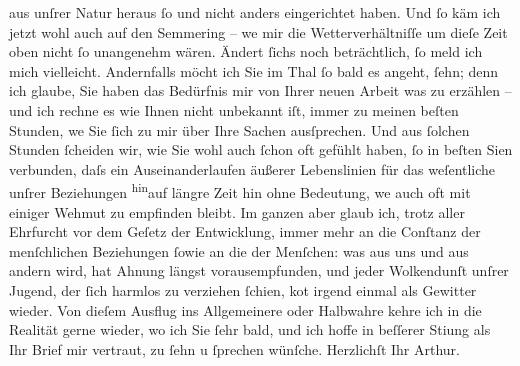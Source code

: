                aus unſrer Natur heraus{ }ſo und nicht anders eingerichtet haben. Und{ }ſo käm ich jetzt
               wohl auch auf den Semmering – we{\geminationn} mir die Wetterverhältniſſe um dieſe Zeit oben nicht{ }ſo
               unangenehm wären. Ändert{ }ſichs noch beträchtlich,{ }ſo meld ich mich vielleicht.
               Andernfalls möcht ich Sie im Thal{ }ſo bald es angeht,{ }ſehn; denn ich glaube, {\pb}Sie haben das Bedürfnis mir von Ihrer neuen Arbeit was zu erzählen – und
               ich rechne es wie Ihnen nicht unbekannt iſt, immer zu meinen beſten Stunden, we{\geminationn} Sie{ }ſich zu mir über Ihre Sachen ausſprechen. Und aus{ }ſolchen Stunden{ }ſcheiden wir, wie Sie wohl auch{ }ſchon oft gefühlt haben,{ }ſo in beſten
                  Si{\geminationn}en verbunden, daſs ein Auseinanderlaufen äußerer
               Lebenslinien für das weſentliche unſrer Beziehungen \substVorne{}\textsuperscript{hin}\substDazwischen{}auf\substHinten{} längre Zeit \introOben{}hin\introOben{} ohne Bedeutung, we{\geminationn} auch oft mit einiger Wehmut zu empfinden bleibt. Im
               ganzen aber glaub ich, trotz aller Ehrfurcht vor dem Geſetz der Entwicklung, immer
               mehr an die Conſtanz der \introOben{}menſchlichen\introOben{} Beziehungen \introOben{}ſo\introOben{}wie an die der Menſchen: was aus uns und aus andern wird,
               hat Ahnung längst vorausempfunden, und jeder Wolkendunſt unſrer Jugend, der{ }ſich
               harmlos zu verziehen{ }ſchien, ko{\geminationm}t irgend einmal als
               Gewitter wieder. Von dieſem Ausflug ins Allgemeinere oder Halbwahre kehre ich in die
               Realität gerne wieder, wo ich Sie{ }ſehr bald, und ich hoffe in beſſerer Sti{\geminationm}ung als Ihr Brief mir vertraut, zu{ }ſehn u{ }ſprechen
               wünſche.\pend
           \pstart Herzlichſt Ihr \spacefill\mbox{Arthur.}\pend{}\endnumbering{}  \newcommand{\dateiname}{L02168}\newcommand{\titel}{Arthur Schnitzler an Hugo von Hofmannsthal, 28. 3. 1914}\newcommand{\editorInnen}{Martin Anton Müller und Gerd-Hermann Susen}
